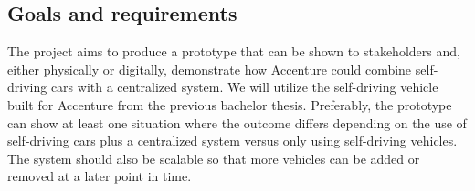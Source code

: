 \subsection{Goals and requirements}
The project aims to produce a prototype that can be shown to stakeholders and, either physically or digitally, demonstrate how Accenture could combine self-driving cars with a centralized system. We will utilize the self-driving vehicle built for Accenture from the previous bachelor thesis. Preferably, the prototype can show at least one situation where the outcome differs depending on the use of self-driving cars plus a centralized system versus only using self-driving vehicles. The system should also be scalable so that more vehicles can be added or removed at a later point in time.